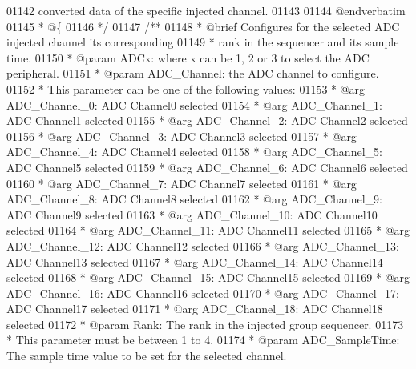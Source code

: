 \begin{DoxyCode}
01142 \textcolor{comment}{      converted data of the specific injected channel.}
01143 \textcolor{comment}{}
01144 \textcolor{comment}{@endverbatim}
01145 \textcolor{comment}{  * @\{}
01146 \textcolor{comment}{  */}
01147 \textcolor{comment}{/**}
01148 \textcolor{comment}{  * @brief  Configures for the selected ADC injected channel its corresponding}
01149 \textcolor{comment}{  *         rank in the sequencer and its sample time.}
01150 \textcolor{comment}{  * @param  ADCx: where x can be 1, 2 or 3 to select the ADC peripheral.}
01151 \textcolor{comment}{  * @param  ADC\_Channel: the ADC channel to configure. }
01152 \textcolor{comment}{  *          This parameter can be one of the following values:}
01153 \textcolor{comment}{  *            @arg ADC\_Channel\_0: ADC Channel0 selected}
01154 \textcolor{comment}{  *            @arg ADC\_Channel\_1: ADC Channel1 selected}
01155 \textcolor{comment}{  *            @arg ADC\_Channel\_2: ADC Channel2 selected}
01156 \textcolor{comment}{  *            @arg ADC\_Channel\_3: ADC Channel3 selected}
01157 \textcolor{comment}{  *            @arg ADC\_Channel\_4: ADC Channel4 selected}
01158 \textcolor{comment}{  *            @arg ADC\_Channel\_5: ADC Channel5 selected}
01159 \textcolor{comment}{  *            @arg ADC\_Channel\_6: ADC Channel6 selected}
01160 \textcolor{comment}{  *            @arg ADC\_Channel\_7: ADC Channel7 selected}
01161 \textcolor{comment}{  *            @arg ADC\_Channel\_8: ADC Channel8 selected}
01162 \textcolor{comment}{  *            @arg ADC\_Channel\_9: ADC Channel9 selected}
01163 \textcolor{comment}{  *            @arg ADC\_Channel\_10: ADC Channel10 selected}
01164 \textcolor{comment}{  *            @arg ADC\_Channel\_11: ADC Channel11 selected}
01165 \textcolor{comment}{  *            @arg ADC\_Channel\_12: ADC Channel12 selected}
01166 \textcolor{comment}{  *            @arg ADC\_Channel\_13: ADC Channel13 selected}
01167 \textcolor{comment}{  *            @arg ADC\_Channel\_14: ADC Channel14 selected}
01168 \textcolor{comment}{  *            @arg ADC\_Channel\_15: ADC Channel15 selected}
01169 \textcolor{comment}{  *            @arg ADC\_Channel\_16: ADC Channel16 selected}
01170 \textcolor{comment}{  *            @arg ADC\_Channel\_17: ADC Channel17 selected}
01171 \textcolor{comment}{  *            @arg ADC\_Channel\_18: ADC Channel18 selected                       }
01172 \textcolor{comment}{  * @param  Rank: The rank in the injected group sequencer. }
01173 \textcolor{comment}{  *          This parameter must be between 1 to 4.}
01174 \textcolor{comment}{  * @param  ADC\_SampleTime: The sample time value to be set for the selected channel. }

\end{DoxyCode}
